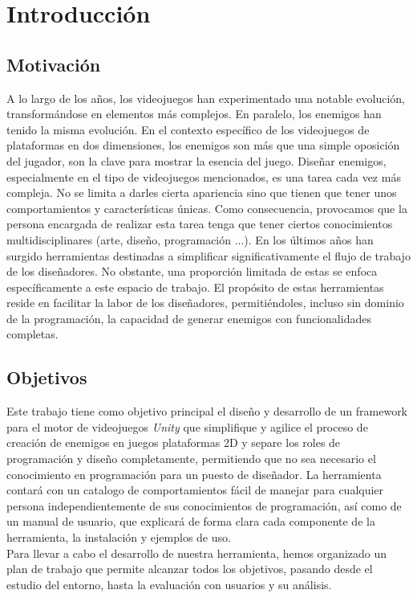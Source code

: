 \chapter{Introducción}
\label{cap:introduccion}


\section{Motivación}
A lo largo de los años, los videojuegos han experimentado una notable evolución, transformándose en elementos más complejos. En paralelo, los enemigos han tenido la misma evolución. En el contexto específico de los videojuegos de plataformas en dos dimensiones, los enemigos son más que una simple oposición del jugador, son la clave para mostrar la esencia del juego. Diseñar enemigos, especialmente en el tipo de videojuegos mencionados, es una tarea cada vez más compleja. No se limita a darles cierta apariencia sino que tienen que tener unos comportamientos y características únicas. Como consecuencia, provocamos que la persona encargada de realizar esta tarea tenga que tener ciertos conocimientos multidisciplinares (arte, diseño, programación ...). 
En los últimos años han surgido herramientas destinadas a simplificar significativamente el flujo de trabajo de los diseñadores. No obstante, una proporción limitada de estas se enfoca específicamente a este espacio de trabajo. El propósito de estas herramientas reside en facilitar la labor de los diseñadores, permitiéndoles, incluso sin dominio de la programación, la capacidad de generar enemigos con funcionalidades completas.

\section{Objetivos}
Este trabajo tiene como objetivo principal el diseño y desarrollo de un framework para el motor de videojuegos \textit{Unity} que simplifique y agilice el proceso de creación de enemigos en juegos plataformas 2D y separe los roles de programación y diseño completamente, permitiendo que no sea necesario el conocimiento en programación para un puesto de diseñador.
La herramienta contará con un catalogo de comportamientos fácil de manejar para cualquier persona independientemente de sus conocimientos de programación, así como de un manual de usuario, que explicará de forma clara cada componente de la herramienta, la instalación y ejemplos de uso. \\
Para llevar a cabo el desarrollo de nuestra herramienta, hemos organizado un plan de trabajo que permite alcanzar todos los objetivos, pasando desde el estudio del entorno, hasta la evaluación con usuarios y su análisis.


